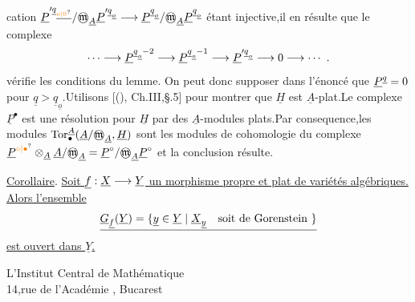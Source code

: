 cation $\handwritten{\underline P'^{\underline q_{\underline{\unsure{o|0}}}}/\text{\textcircled{$\mathfrak m$}}_{\underline A}\underline P'^{\underline q_{\underline o}}\longrightarrow\underline P^{\underline q_{\underline o}}/\text{\textcircled{$\mathfrak m$}}_{\underline A}\underline P^{\underline q_{\underline o}}}$ étant injective,il en résulte que le complexe
\[
\cdots\longrightarrow\underline P^{\underline q_{\underline o}-2}\longrightarrow\underline P^{\underline q_{\underline o}-1}\longrightarrow\underline P'^{\underline q_{\underline o}}\longrightarrow0\longrightarrow\cdots\ .
\]
vérifie les conditions du lemme. On peut donc supposer dans l'énoncé que $\underline P^{\underline q}=0$ pour $\underline q>\underline q_{\underline o}$.Utilisons [(), Ch.III,§.5] pour montrer que $\underline H$ est $\underline A$-plat.Le complexe $\underline P^\bullet$ est une résolution pour $\underline H$ par des $\underline A$-modules plats.Par consequence,les modules
$\operatorname{Tor}^{\underline A}_\bullet(\underline A/\text{\textcircled{$\mathfrak m$}}_{\underline A},\underline H)$ sont les modules de cohomologie du complexe $\handwritten{\underline P^{\unsure{\circ|\bullet}}\otimes_{\underline A}\underline A/\text{\textcircled{$\mathfrak m$}}_{\underline A}=\underline P^\circ/\text{\textcircled{$\mathfrak m$}}_{\underline A}\underline P^\circ}$ et la conclusion résulte.

\uline{Corollaire}. \uline{Soit $\underline f:\underline X\longrightarrow\underline Y$ un morphisme propre et plat de variétés algébriques. Alors l'ensemble}
\[
\underline{\handwritten{\underline G_{\underline f}(\underline Y)=\{\underline y\in\underline Y\mid\underline X_{\underline y}}\quad\text{soit de Gorenstein}\ \handwritten{\}}}
\]
\uline{est ouvert dans $\underline Y$.}

\begin{flushright}L'Institut Central de Mathématique\\
14,rue de l'Académie , Bucarest\\
\end{flushright}

